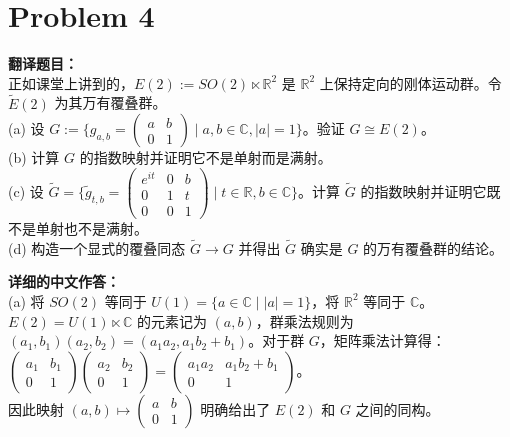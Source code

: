 \documentclass{ctexart}
\begin{document}
\vspace{2em}
\section*{Problem 4}
\textbf{翻译题目：}\\
正如课堂上讲到的，$E(2) := SO(2) \ltimes \mathbb{R}^2$ 是 $\mathbb{R}^2$ 上保持定向的刚体运动群。令 $\tilde{E}(2)$ 为其万有覆叠群。\\
(a) 设 $G := \{g_{a,b} = \begin{pmatrix} a & b \\ 0 & 1 \end{pmatrix} \mid a, b \in \mathbb{C}, |a|=1\}$。验证 $G \cong E(2)$。\\
(b) 计算 $G$ 的指数映射并证明它不是单射而是满射。\\
(c) 设 $\tilde{G} = \{\tilde{g}_{t,b} = \begin{pmatrix} e^{it} & 0 & b \\ 0 & 1 & t \\ 0 & 0 & 1 \end{pmatrix} \mid t \in \mathbb{R}, b \in \mathbb{C}\}$。计算 $\tilde{G}$ 的指数映射并证明它既不是单射也不是满射。\\
(d) 构造一个显式的覆叠同态 $\tilde{G} \to G$ 并得出 $\tilde{G}$ 确实是 $G$ 的万有覆叠群的结论。

\vspace{1em}
\textbf{详细的中文作答：}\\
(a) 将 $SO(2)$ 等同于 $U(1) = \{a \in \mathbb{C} \mid |a| = 1\}$，将 $\mathbb{R}^2$ 等同于 $\mathbb{C}$。$E(2) = U(1) \ltimes \mathbb{C}$ 的元素记为 $(a, b)$，群乘法规则为 $(a_1, b_1)(a_2, b_2) = (a_1 a_2, a_1 b_2 + b_1)$。对于群 $G$，矩阵乘法计算得：\\
$\begin{pmatrix} a_1 & b_1 \\ 0 & 1 \end{pmatrix} \begin{pmatrix} a_2 & b_2 \\ 0 & 1 \end{pmatrix} = \begin{pmatrix} a_1 a_2 & a_1 b_2 + b_1 \\ 0 & 1 \end{pmatrix}$。\\
因此映射 $(a, b) \mapsto \begin{pmatrix} a & b \\ 0 & 1 \end{pmatrix}$ 明确给出了 $E(2)$ 和 $G$ 之间的同构。
\end{document}
